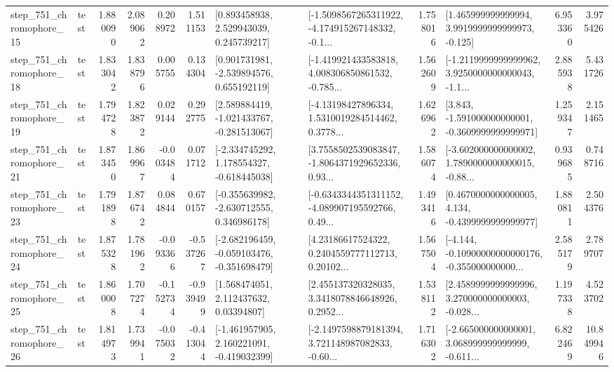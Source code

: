 \begin{tabular}{llrrrrllrlrr}
  step\_751\_chromophore\_15 &      test &      1.880090 &    2.089062 &      0.208972 &  1.511153 &     [0.893458938, 2.529943039, 0.245739217] &  [-1.5098567265311922, -4.174915267148332, -0.1... &       1.758016 &    [1.465999999999994, 3.9919999999999973, -0.125] &            6.953360 &          3.975426 \\
  step\_751\_chromophore\_18 &      test &      1.833042 &    1.838796 &      0.005755 &  0.134304 &    [0.901731981, -2.539894576, 0.655192119] &  [-1.419921433583818, 4.008306850861532, -0.785... &       1.562609 &  [-1.2119999999999962, 3.9250000000000043, -1.1... &            2.885938 &          5.431726 \\
  step\_751\_chromophore\_19 &      test &      1.794728 &    1.823872 &      0.029144 &  0.292775 &   [2.589884419, -1.021433767, -0.281513067] &  [-4.13198427896334, 1.5310019284514462, 0.3778... &       1.626962 &   [3.843, -1.591000000000001, -0.3609999999999971] &            1.259347 &          2.151465 \\
  step\_751\_chromophore\_21 &      test &      1.873450 &    1.869967 &     -0.003484 &  0.071712 &   [-2.334745292, 1.178554327, -0.618445038] &  [3.7558502539083847, -1.8064371929652336, 0.93... &       1.586074 &  [-3.602000000000002, 1.7890000000000015, -0.88... &            0.939685 &          0.748716 \\
  step\_751\_chromophore\_23 &      test &      1.791898 &    1.876742 &      0.084844 &  0.670157 &   [-0.355639982, -2.630712555, 0.346986178] &  [-0.6343344351311152, -4.089907195592766, 0.49... &       1.493416 &   [0.4670000000000005, 4.134, -0.4399999999999977] &            1.880811 &          2.504376 \\
  step\_751\_chromophore\_24 &      test &      1.875328 &    1.781962 &     -0.093366 & -0.537267 &  [-2.682196459, -0.059103476, -0.351698479] &  [4.23186617524322, 0.2404559777112713, 0.20102... &       1.567504 &  [-4.144, -0.10900000000000176, -0.355000000000... &            2.585179 &          2.789707 \\
  step\_751\_chromophore\_25 &      test &      1.860008 &    1.707274 &     -0.152734 & -0.939499 &      [1.568474051, 2.112437632, 0.03394807] &  [2.455137320328035, 3.3418078846648926, 0.2952... &       1.538112 &  [2.4589999999999996, 3.270000000000003, -0.028... &            1.197338 &          4.523702 \\
  step\_751\_chromophore\_26 &      test &      1.814973 &    1.739941 &     -0.075032 & -0.413044 &   [-1.461957905, 2.160221091, -0.419032399] &  [-2.1497598879181394, 3.721148987082833, -0.60... &       1.716302 &  [-2.665000000000001, 3.068999999999999, -0.611... &            6.822469 &         10.849946 \\

\end{tabular}
